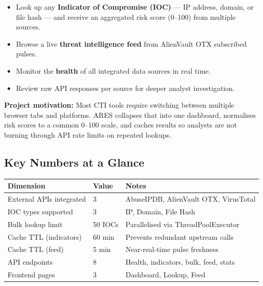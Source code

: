 \documentclass[11pt,a4paper]{article}
\begin{document}
\begin{itemize}[leftmargin=1.5cm]
  \item Look up any \textbf{Indicator of Compromise (IOC)} — IP address, domain, or file hash — and receive an aggregated risk score (0--100) from multiple sources.
  \item Browse a live \textbf{threat intelligence feed} from AlienVault OTX subscribed pulses.
  \item Monitor the \textbf{health} of all integrated data sources in real time.
  \item Review raw API responses per source for deeper analyst investigation.
\end{itemize}

\begin{bluebox}
\textbf{Project motivation:} Most CTI tools require switching between multiple browser tabs and platforms. ARES collapses that into one dashboard, normalises risk scores to a common 0--100 scale, and caches results so analysts are not burning through API rate limits on repeated lookups.
\end{bluebox}

\subsection*{Key Numbers at a Glance}

\begin{center}
\begin{tabular}{lll}
\toprule
\textbf{Dimension} & \textbf{Value} & \textbf{Notes} \\
\midrule
External APIs integrated & 3 & AbuseIPDB, AlienVault OTX, VirusTotal \\
IOC types supported & 3 & IP, Domain, File Hash \\
Bulk lookup limit & 50 IOCs & Parallelised via ThreadPoolExecutor \\
Cache TTL (indicators) & 60 min & Prevents redundant upstream calls \\
Cache TTL (feed) & 5 min & Near-real-time pulse freshness \\
API endpoints & 8 & Health, indicators, bulk, feed, stats \\
Frontend pages & 3 & Dashboard, Lookup, Feed \\
\bottomrule
\end{tabular}
\end{center}

\newpage

\end{document}
